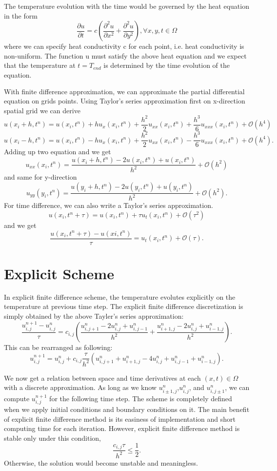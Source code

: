 \documentclass[10pt,a4paper]{report}
\begin{document}
The temperature evolution with the time would be governed by the heat equation in the form \[{\frac{\partial u}{\partial t}}=c({\frac{\partial^2 u}{\partial x^2}}+{\frac{\partial^2 u}{\partial y^2}}),\forall{x,y,t}\in \Omega\]
where we can specify heat conductivity c for each point, i.e. heat conductivity is non-uniform. The function u must satisfy the above heat equation and we expect that the temperature at $t=T_{end}$ is determined by the time evolution of the equation.

With finite difference approximation, we can approximate the partial differential equation on grids points. Using Taylor's series approximation first on x-direction spatial grid we can derive
\[u(x_i+h,t^n)=u(x_i,t^n)+hu_x(x_i,t^n)+{\frac{h^2}{2}}u_{xx}(x_i,t^n)+{\frac{h^3}{6}}u_{xxx}(x_i,t^n)+\mathcal{O}(h^4)\]
\[u(x_i-h,t^n)=u(x_i,t^n)-hu_x(x_i,t^n)+{\frac{h^2}{2}}u_{xx}(x_i,t^n)-{\frac{h^3}{6}}u_{xxx}(x_i,t^n)+\mathcal{O}(h^4) .\]
Adding up two equation and we get
\[u_{xx}(x_i,t^n)={\frac{u(x_i+h,t^n)-2u(x_i,t^n)+u(x_i,t^n)}{h^2}}+\mathcal{O}(h^2)\]
and same for y-direction
\[u_{yy}(y_i,t^n)={\frac{u(y_i+h,t^n)-2u(y_i,t^n)+u(y_i,t^n)}{h^2}}+\mathcal{O}(h^2).\]
For time difference, we can also write a Taylor's series approximation.
\[u(x_i,t^n+\tau)=u(x_i,t^n)+\tau u_t(x_i,t^n)+\mathcal{O}(\tau^2) \]and we get \[{\frac{u(x_i,t^n+\tau)-u(xi,t^n)}{\tau}}=u_t(x_i,t^n)+\mathcal{O}(\tau).\] 

\section{Explicit Scheme}

In explicit finite difference scheme, the temperature evolutes explicitly on the temperature at previous time step. The explicit finite difference discretization is simply obtained by the above Tayler's series approximation: \[{\frac{u^{n+1}_{i,j}-u^n_{i,j}}{\tau}}=c_{i,j}({\frac{u^n_{i,j+1}-2u^n_{i,j}+u^n_{i,j-1}}{h^2}}+{\frac{u^n_{i+1,j}-2u^n_{i,j}+u^n_{i-1,j}}{h^2}}).\]
This can be rearranged as following:\[u^{n+1}_{i,j}=u^{n}_{i,j}+c_{i,j}{\frac{\tau}{h^2}}(u^n_{i,j+1}+u^n_{i+1,j}-4u^n_{i,j}+u^n_{i,j-1}+u^n_{i-1,j}).\]

We now get a relation between space and time derivatives at each $(x,t)\in \Omega$ with a discrete approximation. As long as we know $u^n_{i\pm 1,j}$,$u^n_{i,j}$, and $u^n_{i,j\pm 1}$, we can compute $u^{n+1}_{i,j}$ for the following time step. The scheme is completely defined when we apply initial conditions and boundary conditions on it. 
The main benefit of explicit finite difference method is its easiness of implementation and short computing time for each iteration. However, explicit finite difference method is stable only under this condition,\[{\frac{c_{i,j}\tau}{h^2}}\leq {\frac{1}{2}}.\] Otherwise, the solution would become unstable and meaningless.
\end{document}
